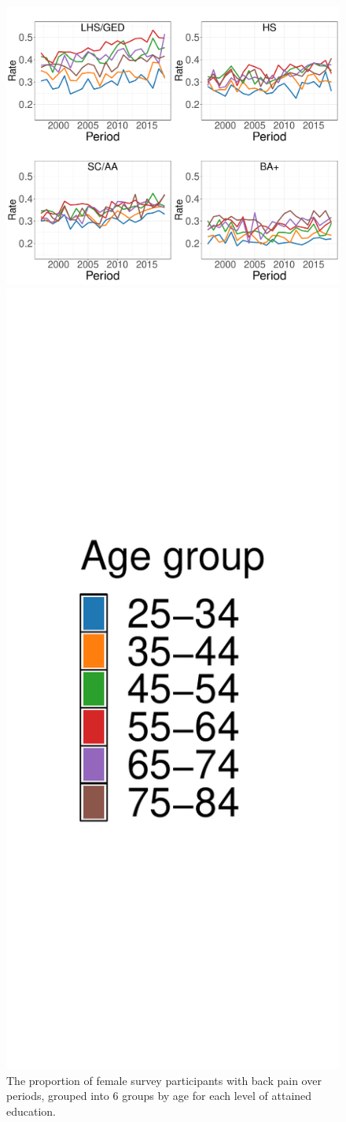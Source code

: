\begin{figure}[!ht]
    \centering
    \begin{minipage}{.5\textwidth}
      \centering
      \includegraphics[width=1.6\linewidth]{Figures/rateplot_age_f.pdf}
    \end{minipage}%
    \begin{minipage}{.5\textwidth}
      \hfill
      \includegraphics[width=0.4\linewidth]{Figures/rateplot_age_legend_f.pdf}
    \end{minipage}
    \caption{The proportion of female survey participants with back pain over periods, grouped into $6$ groups by age for each level of attained education.}
    \label{figure:explorative:rateplot_age_f}
\end{figure}

